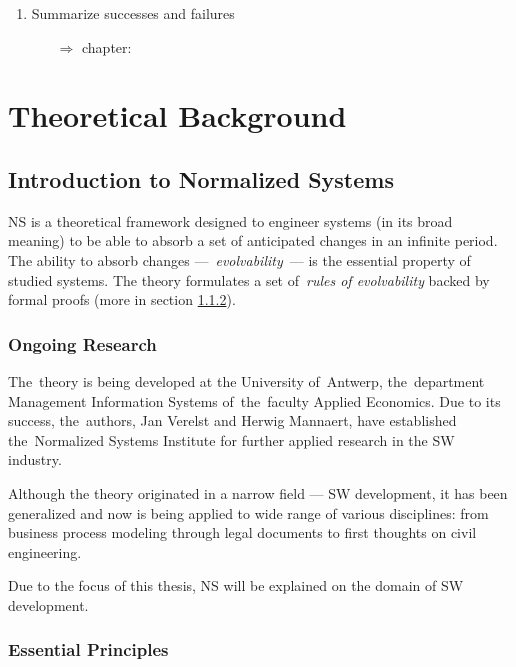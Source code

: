 \documentclass[thesis=M,english,hidelinks]{FITthesis}[2012/10/20]
\begin{document}
\begin{enumerate}
	\item Summarize successes and failures
	\begin{itemize}
		\item[$\Rightarrow$] chapter: \textit{}
	\end{itemize}
\end{enumerate}

% 
% 
\chapter{Theoretical Background}
\label{sec:theoretical_background}

% 
% 
\section{Introduction to Normalized Systems}
\acrfull{NS} is a theoretical framework designed to engineer systems (in its broad meaning) to be able to absorb a set of anticipated changes in an infinite period. The ability to absorb changes ---~\textit{evolvability}~--- is the essential property of studied systems. The theory formulates a set of~\textit{rules of evolvability} backed by formal proofs (more in section \ref{sec:evolvability_rules}).

\subsection{Ongoing Research}
The~theory is being developed at the University of~Antwerp, the~department Management Information Systems of~the~faculty Applied Economics. Due to its success, the~authors, Jan Verelst and Herwig Mannaert, have established the~Normalized Systems Institute for further applied research in the \acrshort{SW} industry.

Although the theory originated in a narrow field --- \acrlong{SW} development, it has been generalized and now is being applied to wide range of various disciplines: from business process modeling through legal documents to first thoughts on civil engineering.~\cite{ns-towards-evolvable}

Due to the focus of this thesis, \acrlong{NS} will be explained on the domain of \acrlong{SW} development.

\subsection{Essential Principles}
\label{sec:evolvability_rules}
\end{document}

